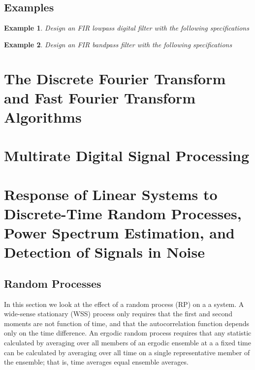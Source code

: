 \documentclass[11pt]{book}
\theoremstyle{example}
\newtheorem{example}{Example}[section]
\begin{document}
\section{Examples}

\begin{example}
	Design an FIR lowpass digital filter with the following specifications
\end{example}

\begin{example}
	Design an FIR bandpass filter with the following specifications
\end{example}

\chapter[DFT and FFT Algorithms]{The Discrete Fourier Transform and Fast Fourier Transform Algorithms}

\chapter{Multirate Digital Signal Processing}

\chapter[Response of Linear Systems]{Response of Linear Systems to Discrete-Time Random Processes, Power Spectrum Estimation, and Detection of Signals in Noise}

\section{Random Processes}

In this section we look at the effect of a random process (RP) on a a system. A wide-sense stationary (WSS) process only requires that the first and second moments are not function of time, and that the autocorrelation function depends only on the time difference. An ergodic random process requires that any statistic calculated by averaging over all members of an ergodic ensemble at a a fixed time can be calculated by averaging over all time on a single representative member of the ensemble; that is, time averages equal ensemble averages.
\end{document}
